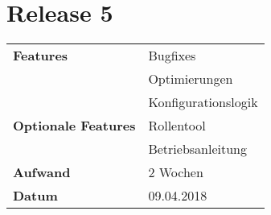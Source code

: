 \section*{Release 5}
\label{sec:release_5}

\begin{tabular}{p{5cm} p{9cm}}
    \textbf{Features} &  Bugfixes \\
    & Optimierungen \\
    & Konfigurationslogik \\
    \textbf{Optionale Features} &  Rollentool \\
    & Betriebsanleitung \\
    \hline
    \textbf{Aufwand} & 2 Wochen\\
    \hline
    \textbf{Datum} & 09.04.2018
\end{tabular}
